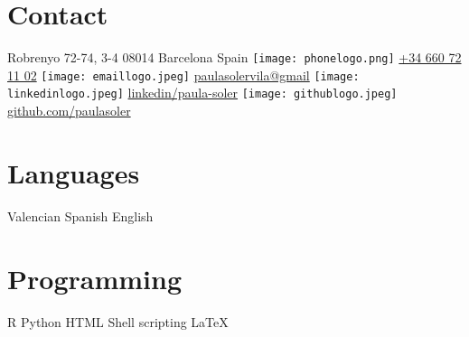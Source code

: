 \documentclass[]{friggeri-cv} %
\begin{document}



\begin{aside} %
  \section{Contact}
   Robrenyo 72-74, 3-4
   08014 Barcelona
    Spain
   \texttt{[image: phonelogo.png]}
   \href{tel:+34660721102}{+34 660 72 11 02}
  \texttt{[image: emaillogo.jpeg]}
  \href{mailto:paulasolervila@gmail.com}{paulasolervila@gmail}
  \texttt{[image: linkedinlogo.jpeg]}
  \href{https://www.linkedin.com/in/paula-soler-vila-11b008a3/}{linkedin/paula-soler}
  \texttt{[image: githublogo.jpeg]}
  \href{https://github.com/paulasoler}{github.com/paulasoler}
  \section{Languages}
  Valencian
  Spanish
  English
  \section{Programming}
  R {\FA \faStar \faStar \faStar}
  Python {\FA \faStar \faStar}
  HTML {\FA \faStar}
  Shell scripting {\FA \faStar \faStar}
  \LaTeX {\FA \faStar \faStar}

\end{aside}
\end{document}
